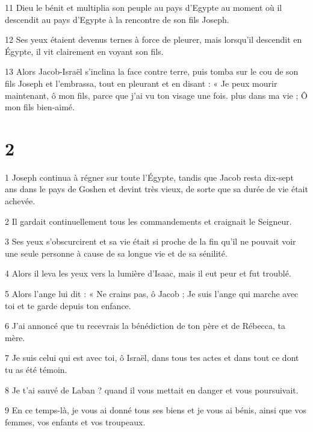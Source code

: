 \par 11 Dieu le bénit et multiplia son peuple au pays d'Egypte au moment où il descendit au pays d'Egypte à la rencontre de son fils Joseph.

\par 12 Ses yeux étaient devenus ternes à force de pleurer, mais lorsqu'il descendit en Égypte, il vit clairement en voyant son fils.

\par 13 Alors Jacob-Israël s'inclina la face contre terre, puis tomba sur le cou de son fils Joseph et l'embrassa, tout en pleurant et en disant : « Je peux mourir maintenant, ô mon fils, parce que j'ai vu ton visage une fois. plus dans ma vie ; Ô mon fils bien-aimé.


\chapter{2}


\par 1 Joseph continua à régner sur toute l'Égypte, tandis que Jacob resta dix-sept ans dans le pays de Goshen et devint très vieux, de sorte que sa durée de vie était achevée.

\par 2 Il gardait continuellement tous les commandements et craignait le Seigneur.

\par 3 Ses yeux s'obscurcirent et sa vie était si proche de la fin qu'il ne pouvait voir une seule personne à cause de sa longue vie et de sa sénilité.

\par 4 Alors il leva les yeux vers la lumière d'Isaac, mais il eut peur et fut troublé.

\par 5 Alors l'ange lui dit : « Ne crains pas, ô Jacob ; Je suis l'ange qui marche avec toi et te garde depuis ton enfance.

\par 6 J'ai annoncé que tu recevrais la bénédiction de ton père et de Rébecca, ta mère.

\par 7 Je suis celui qui est avec toi, ô Israël, dans tous tes actes et dans tout ce dont tu as été témoin.

\par 8 Je t'ai sauvé de Laban ? quand il vous mettait en danger et vous poursuivait.

\par 9 En ce temps-là, je vous ai donné tous ses biens et je vous ai bénis, ainsi que vos femmes, vos enfants et vos troupeaux.

